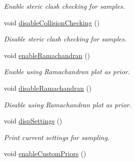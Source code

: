 \begin{DoxyCompactItemize}
\begin{DoxyCompactList}\small\item\em Enable steric clash checking for samples. \end{DoxyCompactList}\item 
\hypertarget{classSLIKMCSampler_ac6ccd675c5f5035b41de865219fdee7d}{void \hyperlink{classSLIKMCSampler_ac6ccd675c5f5035b41de865219fdee7d}{disable\-Collision\-Checking} ()}\label{classSLIKMCSampler_ac6ccd675c5f5035b41de865219fdee7d}

\begin{DoxyCompactList}\small\item\em Disable steric clash checking for samples. \end{DoxyCompactList}\item 
\hypertarget{classSLIKMCSampler_a7e71ac082b1d3fcb870cd47745b2e090}{void \hyperlink{classSLIKMCSampler_a7e71ac082b1d3fcb870cd47745b2e090}{enable\-Ramachandran} ()}\label{classSLIKMCSampler_a7e71ac082b1d3fcb870cd47745b2e090}

\begin{DoxyCompactList}\small\item\em Enable using Ramachandran plot as prior. \end{DoxyCompactList}\item 
\hypertarget{classSLIKMCSampler_a13fdd9e0f4aaf23b7ddd3f93dbf8a3eb}{void \hyperlink{classSLIKMCSampler_a13fdd9e0f4aaf23b7ddd3f93dbf8a3eb}{disable\-Ramachandran} ()}\label{classSLIKMCSampler_a13fdd9e0f4aaf23b7ddd3f93dbf8a3eb}

\begin{DoxyCompactList}\small\item\em Disable using Ramachandran plot as prior. \end{DoxyCompactList}\item 
\hypertarget{classSLIKMCSampler_a17c1029a67f4582a31f692652c33cab2}{void \hyperlink{classSLIKMCSampler_a17c1029a67f4582a31f692652c33cab2}{disp\-Settings} ()}\label{classSLIKMCSampler_a17c1029a67f4582a31f692652c33cab2}

\begin{DoxyCompactList}\small\item\em Print current settings for sampling. \end{DoxyCompactList}\item 
\hypertarget{classSLIKMCSampler_a1cf3cb24295225be1bebae24bf3f62c4}{void \hyperlink{classSLIKMCSampler_a1cf3cb24295225be1bebae24bf3f62c4}{enable\-Custom\-Priors} ()}\label{classSLIKMCSampler_a1cf3cb24295225be1bebae24bf3f62c4}


\end{DoxyCompactItemize}
